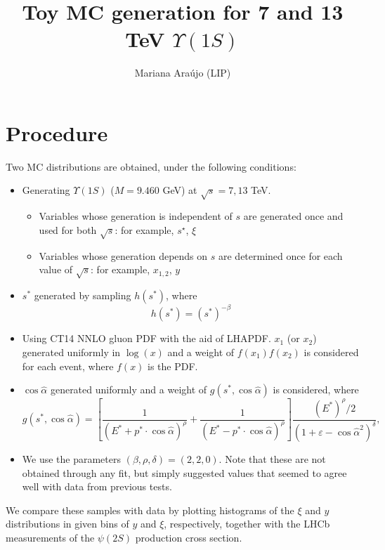 \documentclass{article}
\begin{document}
\title{Toy MC generation for 7 and 13 TeV $\Upsilon(1S)$}
\author{Mariana Ara\'ujo (LIP)}
\maketitle

\section{Procedure}

Two MC distributions are obtained, under the following conditions:
\begin{itemize}
\item Generating $\Upsilon(1S)$ ($M=9.460$ GeV) at $\sqrt{s}=7,13$ TeV.
\begin{itemize}
\item Variables whose generation is independent of $s$ are generated once and used for both $\sqrt{s}$: for example, $s^\star$, $\xi$
\item Variables whose generation depends on $s$ are determined once for each value of $\sqrt{s}$: for example, $x_{1,2}$, $y$
\end{itemize}
\item $s^*$ generated by sampling $h(s^*)$, where
$$ h(s^*) = \left(s^*\right)^{-\beta}$$
\item Using CT14 NNLO gluon PDF with the aid of LHAPDF. $x_1$ (or $x_2$) generated uniformly in $\log(x)$ and a weight of $f(x_1)f(x_2)$ is considered for each event, where $f(x)$ is the PDF.
\item $\cos\hat\alpha$ generated uniformly and a weight of $g(s^*, \cos\hat\alpha)$ is considered, where
$$g(s^*, \cos\hat\alpha) = \left[\frac{1}{(E^*+p^*\cdot\cos\hat\alpha)^\rho}+\frac{1}{(E^*-p^*\cdot\cos\hat\alpha)^\rho}\right]\frac{(E^*)^\rho/2}{(1+\varepsilon-\cos\hat\alpha^2)^\delta},$$
\item We use the parameters $(\beta, \rho, \delta) = (2, 2, 0)$. Note that these are not obtained through any fit, but simply suggested values that seemed to agree well with data from previous tests.
\end{itemize}

We compare these samples with data by plotting histograms of the $\xi$ and $y$ distributions in given bins of $y$ and $\xi$, respectively, together with the LHCb measurements of the $\psi(2S)$ production cross section.
\end{document}
